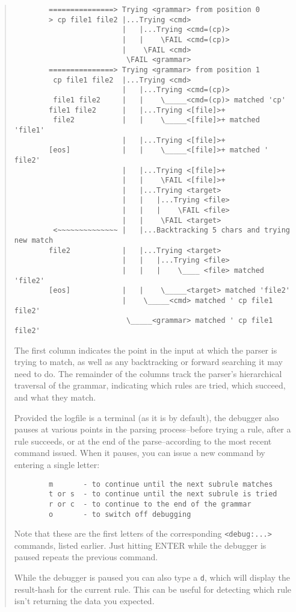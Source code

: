 \begin{it}
\begin{quotation}
\begin{verbatim}
        ===============> Trying <grammar> from position 0
        > cp file1 file2 |...Trying <cmd>
                         |   |...Trying <cmd=(cp)>
                         |   |    \FAIL <cmd=(cp)>
                         |    \FAIL <cmd>
                          \FAIL <grammar>
        ===============> Trying <grammar> from position 1
         cp file1 file2  |...Trying <cmd>
                         |   |...Trying <cmd=(cp)>
         file1 file2     |   |    \_____<cmd=(cp)> matched 'cp'
        file1 file2      |   |...Trying <[file]>+
         file2           |   |    \_____<[file]>+ matched 'file1'
                         |   |...Trying <[file]>+
        [eos]            |   |    \_____<[file]>+ matched ' file2'
                         |   |...Trying <[file]>+
                         |   |    \FAIL <[file]>+
                         |   |...Trying <target>
                         |   |   |...Trying <file>
                         |   |   |    \FAIL <file>
                         |   |    \FAIL <target>
         <~~~~~~~~~~~~~~ |   |...Backtracking 5 chars and trying new match
        file2            |   |...Trying <target>
                         |   |   |...Trying <file>
                         |   |   |    \____ <file> matched 'file2'
        [eos]            |   |    \_____<target> matched 'file2'
                         |    \_____<cmd> matched ' cp file1 file2'
                          \_____<grammar> matched ' cp file1 file2'
\end{verbatim}

The first column indicates the point in the input at which the parser is
trying to match, as well as any backtracking or forward searching it may
need to do. The remainder of the columns track the parser's hierarchical
traversal of the grammar, indicating which rules are tried, which
succeed, and what they match.

Provided the logfile is a terminal (as it is by default), the debugger
also pauses at various points in the parsing process--before trying a
rule, after a rule succeeds, or at the end of the parse--according to
the most recent command issued. When it pauses, you can issue a new
command by entering a single letter:

\begin{verbatim}
        m       - to continue until the next subrule matches
        t or s  - to continue until the next subrule is tried
        r or c  - to continue to the end of the grammar
        o       - to switch off debugging
\end{verbatim}

Note that these are the first letters of the corresponding \verb"<debug:...>"
commands, listed earlier. Just hitting ENTER while the debugger is
paused repeats the previous command.

While the debugger is paused you can also type a \verb'd', which will display
the result-hash for the current rule. This can be useful for detecting
which rule isn't returning the data you expected.
\end{quotation}\end{it}

